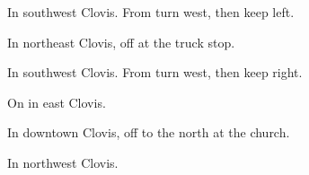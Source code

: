 
\begin{LocationList}

In southwest Clovis.
From  turn west, then keep left.

In northeast Clovis, off    at the truck stop.

In southwest Clovis.
From  turn west, then keep right.

\Location{\TruckStop \Gas \Rest \Service}
On    in east Clovis.

In downtown Clovis, off   to the north at the church.

In northwest Clovis.

\end{LocationList}
